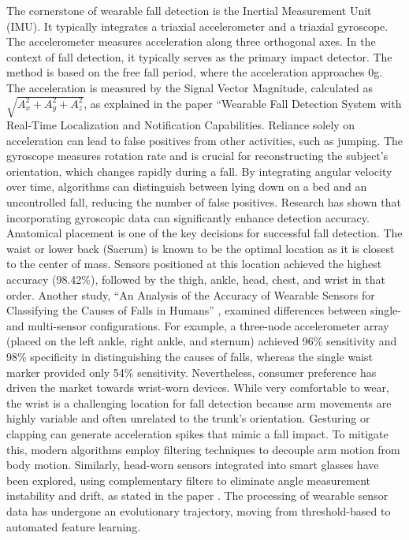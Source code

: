 \documentclass[11pt, a4paper, twoside]{article}
\begin{document}
The cornerstone of wearable fall detection is the Inertial Measurement Unit (IMU). It typically integrates a triaxial accelerometer and a triaxial gyroscope. The accelerometer measures acceleration along three orthogonal axes. In the context of fall detection, it typically serves as the primary impact detector. The method is based on the free fall period, where the acceleration approaches 0g. The acceleration is measured by the Signal Vector Magnitude, calculated as $\sqrt{A_x^2 + A_y^2 + A_z^2}$, as explained in the paper ``Wearable Fall Detection System with Real-Time Localization and Notification Capabilities. \cite{tseng2025wearable} Reliance solely on acceleration can lead to false positives from other activities, such as jumping. The gyroscope measures rotation rate and is crucial for reconstructing the subject's orientation, which changes rapidly during a fall. By integrating angular velocity over time, algorithms can distinguish between lying down on a bed and an uncontrolled fall, reducing the number of false positives. Research has shown that incorporating gyroscopic data can significantly enhance detection accuracy. Anatomical placement is one of the key decisions for successful fall detection. The waist or lower back (Sacrum) is known to be the optimal location as it is closest to the center of mass. Sensors positioned at this location achieved the highest accuracy (98.42\%), followed by the thigh, ankle, head, chest, and wrist in that order. Another study, ``An Analysis of the Accuracy of Wearable Sensors for Classifying the Causes of Falls in Humans'' \cite{aziz2011analysis}, examined differences between single- and multi-sensor configurations. For example, a three-node accelerometer array (placed on the left ankle, right ankle, and sternum) achieved 96\% sensitivity and 98\% specificity in distinguishing the causes of falls, whereas the single waist marker provided only 54\% sensitivity. Nevertheless, consumer preference has driven the market towards wrist-worn devices. While very comfortable to wear, the wrist is a challenging location for fall detection because arm movements are highly variable and often unrelated to the trunk's orientation. Gesturing or clapping can generate acceleration spikes that mimic a fall impact. To mitigate this, modern algorithms employ filtering techniques to decouple arm motion from body motion. Similarly, head-worn sensors integrated into smart glasses have been explored, using complementary filters to eliminate angle measurement instability and drift, as stated in the paper \cite{tseng2025wearable}. The processing of wearable sensor data has undergone an evolutionary trajectory, moving from threshold-based to automated feature learning. 
\end{document}
